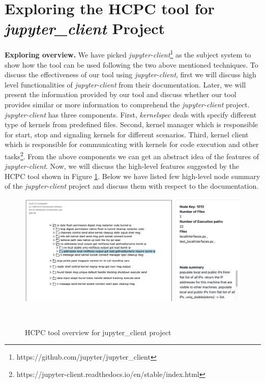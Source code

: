 \section{Exploring the HCPC tool for \emph{jupyter\_client} Project} 
\label{hla3:case_study}
\textbf{Exploring overview. } We have picked \emph{jupyter-client}\footnote{https://github.com/jupyter/jupyter\_client} as the subject system to show how the tool can be used following the two above mentioned techniques. To discuss the effectiveness of our tool using \emph{jupyter-client}, first we will discuss high level functionalities of \emph{jupyter-client} from their documentation. Later, we will present the information provided by our tool and discuss whether our tool provides similar or more information to comprehend the \emph{jupyter-client} project. \emph{jupyter-client} has three components. First, \emph{kernelspec} deals with specify different type of kernels from predefined files. Second, kernel manager which is responsible for start, stop and signaling kernels for different scenarios. Third, kernel client which is responsible for communicating with kernels for code execution and other tasks\footnote{https://jupyter-client.readthedocs.io/en/stable/index.html}. From the above components we can get an abstract idea of the features of \emph{jupyter-client}. Now, we will discuss the high-level features suggested by the  HCPC tool shown in Figure \ref{fig:tool_overview_jupyter_client}. Below we have listed few high-level node summary of the \emph{jupyter-client} project and discuss them with respect to the documentation.

\begin{figure}[h]
  \centering
  \includegraphics[width=\columnwidth]{figures/hla3/hla3_jupyter_overview.png}
  \caption{HCPC tool overview for jupyter\_client project }~\label{fig:tool_overview_jupyter_client}
\end{figure}

